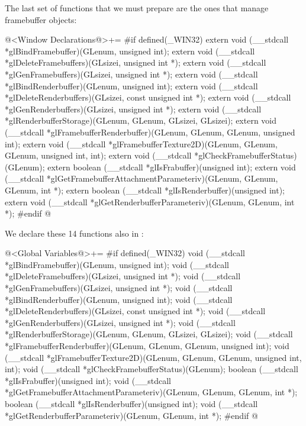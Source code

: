 The last set of functions that we must prepare are the ones that
manage framebuffer objects:

\iniciocodigo
@<Window Declarations@>+=
#if defined(_WIN32)
extern void (__stdcall *glBindFramebuffer)(GLenum, unsigned int);
extern void (__stdcall *glDeleteFramebuffers)(GLsizei, unsigned int *);
extern void (__stdcall *glGenFramebuffers)(GLsizei, unsigned int *);
extern void (__stdcall *glBindRenderbuffer)(GLenum, unsigned int);
extern void (__stdcall *glDeleteRenderbuffers)(GLsizei, const unsigned int *);
extern void (__stdcall *glGenRenderbuffers)(GLsizei, unsigned int *);
extern void (__stdcall *glRenderbufferStorage)(GLenum, GLenum, GLsizei, GLsizei);
extern void (__stdcall *glFramebufferRenderbuffer)(GLenum, GLenum, GLenum,
                                                   unsigned int);
extern void (__stdcall *glFramebufferTexture2D)(GLenum, GLenum, GLenum,
                                                unsigned int, int);
extern void (__stdcall *glCheckFramebufferStatus)(GLenum);
extern boolean (__stdcall *glIsFrabuffer)(unsigned int);
extern void (__stdcall *glGetFramebufferAttachmentParameteriv)(GLenum, GLenum,
                                                               GLenum, int *);
extern boolean (__stdcall *glIsRenderbuffer)(unsigned int);
extern void (__stdcall *glGetRenderbufferParameteriv)(GLenum, GLenum, int *);
#endif
@
\fimcodigo

We declare these 14 functions also in :

\iniciocodigo
@<Global Variables@>+=
#if defined(_WIN32)
void (__stdcall *glBindFramebuffer)(GLenum, unsigned int);
void (__stdcall *glDeleteFramebuffers)(GLsizei, unsigned int *);
void (__stdcall *glGenFramebuffers)(GLsizei, unsigned int *);
void (__stdcall *glBindRenderbuffer)(GLenum, unsigned int);
void (__stdcall *glDeleteRenderbuffers)(GLsizei, const unsigned int *);
void (__stdcall *glGenRenderbuffers)(GLsizei, unsigned int *);
void (__stdcall *glRenderbufferStorage)(GLenum, GLenum, GLsizei, GLsizei);
void (__stdcall *glFramebufferRenderbuffer)(GLenum, GLenum, GLenum,
                                            unsigned int);
void (__stdcall *glFramebufferTexture2D)(GLenum, GLenum, GLenum,
                                         unsigned int, int);
void (__stdcall *glCheckFramebufferStatus)(GLenum);
boolean (__stdcall *glIsFrabuffer)(unsigned int);
void (__stdcall *glGetFramebufferAttachmentParameteriv)(GLenum, GLenum,
                                                        GLenum, int *);
boolean (__stdcall *glIsRenderbuffer)(unsigned int);
void (__stdcall *glGetRenderbufferParameteriv)(GLenum, GLenum, int *);
#endif
@
\fimcodigo

